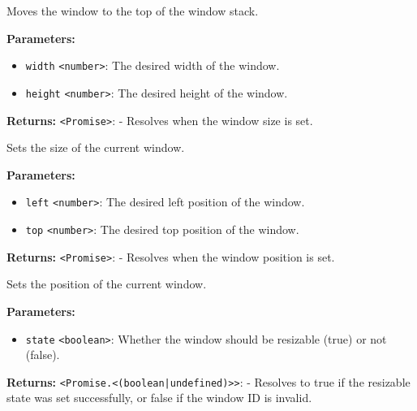 \documentclass[12pt,a4paper]{article}
\begin{document}
\noindent Moves the window to the top of the window stack.

\vspace{5mm}
\noindent {}


\noindent \textbf{Parameters:}
\begin{itemize}
  \item \texttt{width} \texttt{<number>}: The desired width of the window.
  \item \texttt{height} \texttt{<number>}: The desired height of the window.
\end{itemize}

\noindent \textbf{Returns:} \texttt{<Promise>}: - Resolves when the window size is set.

\noindent Sets the size of the current window.

\vspace{5mm}
\noindent {}


\noindent \textbf{Parameters:}
\begin{itemize}
  \item \texttt{left} \texttt{<number>}: The desired left position of the window.
  \item \texttt{top} \texttt{<number>}: The desired top position of the window.
\end{itemize}

\noindent \textbf{Returns:} \texttt{<Promise>}: - Resolves when the window position is set.

\noindent Sets the position of the current window.

\vspace{5mm}
\noindent {}


\noindent \textbf{Parameters:}
\begin{itemize}
  \item \texttt{state} \texttt{<boolean>}: Whether the window should be resizable (\textasciigrave{}true\textasciigrave{}) or not (\textasciigrave{}false\textasciigrave{}).
\end{itemize}

\noindent \textbf{Returns:} \texttt{<Promise.<(boolean|undefined)>>}: - Resolves to \textasciigrave{}true\textasciigrave{} if the resizable state was set successfully, or \textasciigrave{}false\textasciigrave{} if the window ID is invalid.
\end{document}
